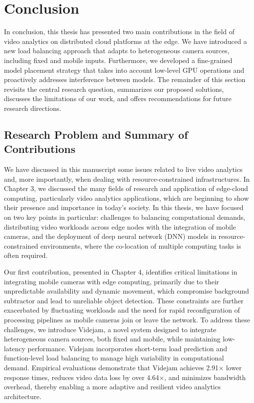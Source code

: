 \setchapterpreamble[u]{\margintoc}
\chapter{Conclusion}

In conclusion, this thesis has presented two main contributions in the field of video analytics on distributed cloud platforms at the edge. We have introduced a new load balancing approach that adapts to heterogeneous camera sources, including fixed and mobile inputs. Furthermore, we developed a fine-grained model placement strategy that takes into account low-level GPU operations and proactively addresses interference between models. The remainder of this section revisits the central research question, summarizes our proposed solutions, discusses the limitations of our work, and offers recommendations for future research directions.

\section{Research Problem and Summary of Contributions}

We have discussed in this manuscript some issues related to live video analytics and, more importantly, when dealing with resource-constrained infrastructures. In Chapter 3, we discussed the many fields of research and application of edge-cloud computing, particularly video analytics applications, which are beginning to show their presence and importance in today's society. In this thesis, we have focused on two key points in particular: challenges to balancing computational demands, distributing video workloads across edge nodes with the integration of mobile cameras, and the deployment of deep neural network (DNN) models in resource-constrained environments, where the co-location of multiple computing tasks is often required.


Our first contribution, presented in Chapter 4, identifies critical limitations in integrating mobile cameras with edge computing, primarily due to their unpredictable availability and dynamic movement, which compromise background subtractor and lead to unreliable object detection. These constraints are further exacerbated by fluctuating workloads and the need for rapid reconfiguration of processing pipelines as mobile cameras join or leave the network. To address these challenges, we introduce Videjam, a novel system designed to integrate heterogeneous camera sources, both fixed and mobile, while maintaining low-latency performance. Videjam incorporates short-term load prediction and function-level load balancing to manage high variability in computational demand. Empirical evaluations demonstrate that Videjam achieves 2.91× lower response times, reduces video data loss by over 4.64×, and minimizes bandwidth overhead, thereby enabling a more adaptive and resilient video analytics architecture.


